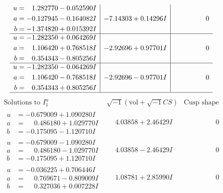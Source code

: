 \documentclass[1p]{elsarticle_modified}
\theoremstyle{definition}
\newcommand{\I}{\sqrt{-1}}
\begin{document}
$$\begin{array}{c|c|c}
\begin{aligned}
u &= \phantom{-}1.282770 - 0.052590 I \\
a &= -0.127945 - 0.164082 I \\
b &= -1.374820 + 0.015392 I\end{aligned}
 & -7.14303 + 0.14296 I & \phantom{-0.000000 } 0 \\ \hline\begin{aligned}
u &= -1.282350 + 0.064269 I \\
a &= \phantom{-}1.106420 + 0.768518 I \\
b &= \phantom{-}0.354343 - 0.805256 I\end{aligned}
 & -2.92696 + 0.97701 I & \phantom{-0.000000 } 0 \\ \hline\begin{aligned}
u &= -1.282350 - 0.064269 I \\
a &= \phantom{-}1.106420 - 0.768518 I \\
b &= \phantom{-}0.354343 + 0.805256 I\end{aligned}
 & -2.92696 - 0.97701 I & \phantom{-0.000000 } 0\\
 \hline 
 \end{array}$$\newpage$$\begin{array}{c|c|c}  
\text{Solutions to }I^u_{1}& \I (\text{vol} + \sqrt{-1}CS) & \text{Cusp shape}\\
 \hline 
\begin{aligned}
u &= -0.679009 + 1.090280 I \\
a &= \phantom{-}0.486180 + 1.029770 I \\
b &= -0.175095 - 1.120710 I\end{aligned}
 & \phantom{-}4.03858 + 2.46429 I & \phantom{-0.000000 } 0 \\ \hline\begin{aligned}
u &= -0.679009 - 1.090280 I \\
a &= \phantom{-}0.486180 - 1.029770 I \\
b &= -0.175095 + 1.120710 I\end{aligned}
 & \phantom{-}4.03858 - 2.46429 I & \phantom{-0.000000 } 0 \\ \hline\begin{aligned}
u &= -0.036225 + 0.706446 I \\
a &= \phantom{-}0.769671 - 0.809009 I \\
b &= \phantom{-}0.327036 + 0.007228 I\end{aligned}
 & \phantom{-}1.08781 + 2.85990 I & \phantom{-0.000000 } 0 \\ \hline\begin{aligned}

\end{aligned}
\end{array}$$
\end{document}
